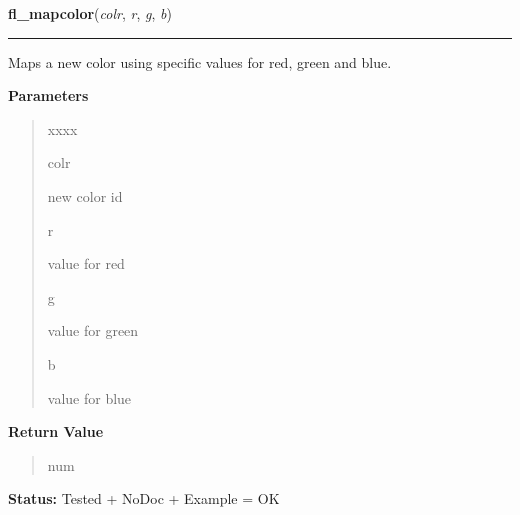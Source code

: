\hspace{.8\funcindent}\begin{boxedminipage}{\funcwidth}

    \raggedright \textbf{fl\_mapcolor}(\textit{colr}, \textit{r}, \textit{g}, \textit{b})

    \vspace{-1.5ex}

    \rule{\textwidth}{0.5\fboxrule}
\setlength{\parskip}{2ex}
    Maps a new color using specific values for red, green and blue.

\setlength{\parskip}{1ex}
      \textbf{Parameters}
      \vspace{-1ex}

      \begin{quote}
        \begin{Ventry}{xxxx}

          \item[colr]

          new color id

          \item[r]

          value for red

          \item[g]

          value for green

          \item[b]

          value for blue

        \end{Ventry}

      \end{quote}

      \textbf{Return Value}
    \vspace{-1ex}

      \begin{quote}
      num

      \end{quote}

\textbf{Status:} Tested + NoDoc + Example = OK



    \end{boxedminipage}

    \label{xformslib:library:fl_mapcolorname}

    \vspace{0.5ex}

